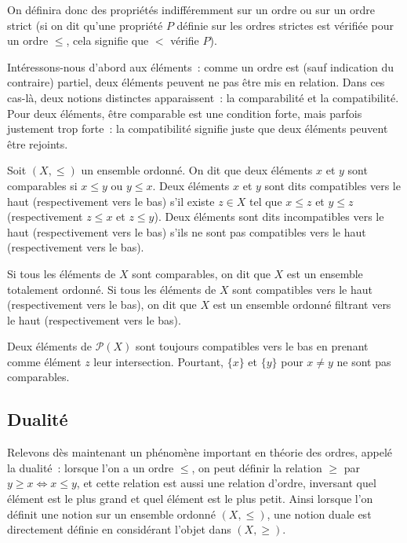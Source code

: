 On définira donc des propriétés indifféremment sur un ordre ou sur un ordre
strict (si on dit qu'une propriété $P$ définie sur les ordres strictes est
vérifiée pour un ordre $\leq$, cela signifie que $<$ vérifie $P$).

Intéressons-nous d'abord aux éléments~: comme un ordre est (sauf indication du
contraire) partiel, deux éléments peuvent ne pas être mis en relation. Dans ces
cas-là, deux notions distinctes apparaissent~: la comparabilité et la
compatibilité. Pour deux éléments, être comparable est une condition forte,
mais parfois justement trop forte~: la compatibilité signifie juste que deux
éléments peuvent être rejoints.

\begin{definition}
  Soit $(X,\leq)$ un ensemble ordonné. On dit que deux éléments $x$ et $y$ sont
  comparables si $x\leq y$ ou $y\leq x$. Deux éléments $x$ et $y$ sont dits
  compatibles vers le haut (respectivement vers le bas) s'il existe $z \in X$
  tel que $x\leq z$ et $y\leq z$ (respectivement $z \leq x$ et $z \leq y$). Deux
  éléments sont dits incompatibles vers le haut (respectivement vers le bas)
  s'ils ne sont pas compatibles vers le haut (respectivement vers le bas).

  Si tous les éléments de $X$ sont comparables, on dit que $X$ est un ensemble
  totalement ordonné.
  Si tous les éléments de $X$ sont compatibles vers le haut (respectivement vers
  le bas), on dit que $X$ est un ensemble ordonné filtrant vers le haut
  (respectivement vers le bas).
\end{definition}

\begin{example}
  Deux éléments de $\mathcal P(X)$ sont toujours compatibles vers le bas en
  prenant comme élément $z$ leur intersection. Pourtant, $\{x\}$ et $\{y\}$ pour
  $x\neq y$ ne sont pas comparables.
\end{example}

\subsection{Dualité}

Relevons dès maintenant un phénomène important en théorie des ordres, appelé la
dualité~: lorsque l'on a un ordre $\leq$, on peut définir la relation $\geq$
par $y\geq x \iff x\leq y$, et cette relation est aussi une relation d'ordre,
inversant quel élément est le plus grand et quel élément est le plus petit.
Ainsi lorsque l'on définit une notion sur un ensemble ordonné $(X,\leq)$, une
notion duale est directement définie en considérant l'objet dans $(X,\geq)$.


